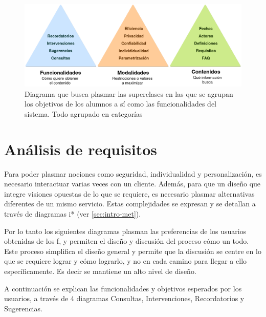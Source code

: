         \begin{figure}[h!]
            \centering
            \includegraphics[width=\textwidth]{media/imagenes/focus_groups/objetivos_y_cualidades.png}
            \caption[Diagrama Tipos de Interacción]{Diagrama que busca plasmar las superclases en las que se agrupan los objetivos de los alumnos a sí como las funcionalidades del sistema. Todo agrupado en categorías}
            \label{fig:my_label}
        \end{figure}

\section{Análisis de requisitos}
        \par Para poder plasmar nociones como seguridad, individualidad y personalización, es necesario interactuar varias veces con un cliente. Además, para que un diseño que integre visiones opuestas de lo que se requiere, es necesario plasmar alternativas diferentes de un mismo servicio. Estas complejidades se expresan y se detallan a través de diagramas i* (ver \ref{sec:intro-met}).
        \par Por lo tanto los siguientes diagramas plasman las preferencias de los usuarios obtenidas de los \acrlong{f}, y permiten el diseño y discusión del proceso cómo un todo. Este proceso simplifica el diseño general y permite que la discusión se centre en lo que se requiere lograr y cómo lograrlo, y no en cada camino para llegar a ello específicamente. Es decir se mantiene un alto nivel de diseño.
        \par A continuación se explican las funcionalidades y objetivos esperados por los usuarios, a través de 4 diagramas Consultas, Intervenciones, Recordatorios y Sugerencias.
    
